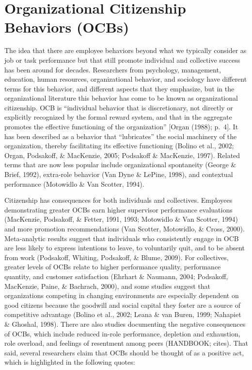 \documentclass[english,,man]{apa6}
\theoremstyle{definition}
\theoremstyle{definition}
\theoremstyle{definition}
\theoremstyle{remark}
\begin{document}
\hypertarget{organizational-citizenship-behaviors-ocbs}{%
\section{Organizational Citizenship Behaviors
(OCBs)}\label{organizational-citizenship-behaviors-ocbs}}

The idea that there are employee behaviors beyond what we typically
consider as job or task performance but that still promote individual
and collective success has been around for decades. Researchers from
psychology, management, education, human resources, organizational
behavior, and sociology have different terms for this behavior, and
different aspects that they emphasize, but in the organizational
literature this behavior has come to be known as organizational
citizenship. OCB is \enquote{individual behavior that is discretionary,
not directly or explicitly recognized by the formal reward system, and
that in the aggregate promotes the effective functioning of the
organization} {[}Organ (1988); p.~4{]}. It has been described as a
behavior that \enquote{lubricates} the social machinery of the
organization, thereby facilitating its effective functioning (Bolino et
al., 2002; Organ, Podsakoff, \& MacKenzie, 2005; Podsakoff \& MacKenzie,
1997). Related terms that are now less popular include organizational
spontaneity (George \& Brief, 1992), extra-role behavior (Van Dyne \&
LePine, 1998), and contextual performance (Motowidlo \& Van Scotter,
1994).

Citizenship has consequences for both individuals and collectives.
Employees demonstrating greater OCBs earn higher supervisor performance
evaluations (MacKenzie, Podsakoff, \& Fetter, 1991, 1993; Motowidlo \&
Van Scotter, 1994) and more promotion recommendations (Van Scotter,
Motowidlo, \& Cross, 2000). Meta-analytic results suggest that
individuals who consistently engage in OCB are less likely to express
intentions to leave, to voluntarily quit, and to be absent from work
(Podsakoff, Whiting, Podsakoff, \& Blume, 2009). For collectives,
greater levels of OCBs relate to higher performance quality, performance
quantity, and customer satisfaction (Ehrhart \& Naumann, 2004;
Podsakoff, MacKenzie, Paine, \& Bachrach, 2000), and some studies
suggest that organizations competing in changing environments are
especially dependent on good citizens because the goodwill and social
capital they foster are a source of competitive advantage (Bolino et
al., 2002; Leana \& van Buren, 1999; Nahapiet \& Ghoshal, 1998). There
are also studies documenting the negative consequences of OCBs, which
include reduced in-role performance, depletion and exhaustion, role
overload, and feelings of resentment among peers (HANDBOOK; cites). That
said, several researchers claim that OCBs should be thought of as a
positive act, which is highlighted in the following quotes:
\end{document}
